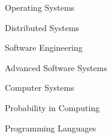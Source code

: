 
\cvcourse
{\begin{courseitems}
\item Operating Systems
\item Distributed Systems
\item Software Engineering
\item Advanced Software Systems
\item Computer Systems
\item Probability in Computing
\item Programming Languages
\end{courseitems}
}
